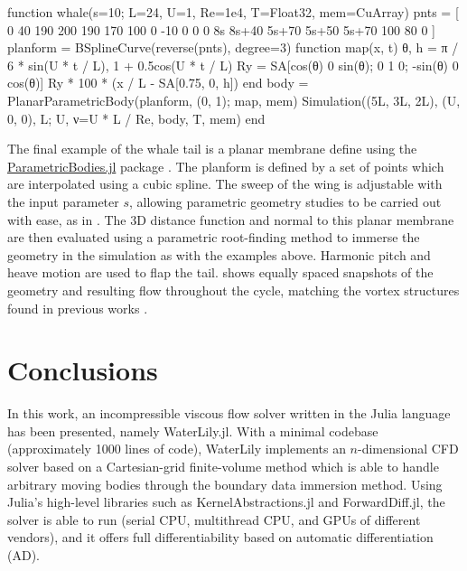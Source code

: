 \documentclass[10pt,a4paper]{article}
\begin{document}
\begin{minipage}{\linewidth}
\begin{jllisting}
function whale(s=10; L=24, U=1, Re=1e4, T=Float32, mem=CuArray)
    pnts = [
        0 40 190   200   190   170   100   0 -10 0
        0  0  8s 8s+40 5s+70 5s+50 5s+70 100  80 0
    ]
    planform = BSplineCurve(reverse(pnts), degree=3)
    function map(x, t)
        θ, h = π / 6 * sin(U * t / L), 1 + 0.5cos(U * t / L)
        Ry = SA[cos(θ) 0 sin(θ); 0 1 0; -sin(θ) 0 cos(θ)]
        Ry * 100 * (x / L - SA[0.75, 0, h])
    end
    body = PlanarParametricBody(planform, (0, 1); map, mem)
    Simulation((5L, 3L, 2L), (U, 0, 0), L; U, ν=U * L / Re, body, T, mem)
end
\end{jllisting}
\end{minipage}

The final example of the whale tail is a planar membrane define using the \href{https://github.com/WaterLily-jl/ParametricBodies.jl}{ParametricBodies.jl} package \citep{WeymouthLauber2023}. The planform is defined by a set of points which are interpolated using a cubic spline. The sweep of the wing is adjustable with the input parameter $s$, allowing parametric geometry studies to be carried out with ease, as in \cite{ZurmanNasution2021}. The 3D distance function and normal to this planar membrane are then evaluated using a parametric root-finding method to immerse the geometry in the simulation as with the examples above. Harmonic pitch and heave motion are used to flap the tail.  shows equally spaced snapshots of the geometry and resulting flow throughout the cycle, matching the vortex structures found in previous works \citep{ZurmanNasution2021}.

\section{Conclusions}\label{sec:conclusions}

In this work, an incompressible viscous flow solver written in the Julia language has been presented, namely WaterLily.jl. With a minimal codebase (approximately 1000 lines of code), WaterLily implements an $n$-dimensional CFD solver based on a Cartesian-grid finite-volume method which is able to handle arbitrary moving bodies through the boundary data immersion method. Using Julia's high-level libraries such as KernelAbstractions.jl and ForwardDiff.jl, the solver is able to run  (serial CPU, multithread CPU, and GPUs of different vendors), and it offers full differentiability based on automatic differentiation (AD).
\end{document}

